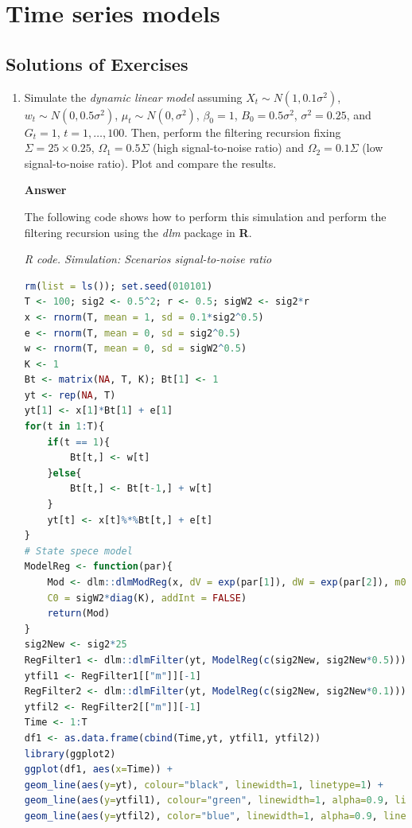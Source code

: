 \chapter{Time series models}\label{chap8}

\section{Solutions of Exercises}\label{sec81}
\begin{enumerate}[leftmargin=*]
	
	\item Simulate the \textit{dynamic linear model} assuming $X_t\sim N(1, 0.1\sigma^2)$, $w_t\sim N(0, 0.5\sigma^2)$, $\mu_t\sim N(0, \sigma^2)$, $\beta_0=1$, ${B}_0=0.5\sigma^2$, $\sigma^2=0.25$, and ${G}_t=1$, $t=1,\dots,100$. Then, perform the filtering recursion fixing $\Sigma=25\times 0.25$, $\Omega_1=0.5\Sigma$ (high signal-to-noise ratio) and  $\Omega_2=0.1\Sigma$ (low signal-to-noise ratio). Plot and compare the results. 	
	
	\textbf{Answer}
	
	The following code shows how to perform this simulation and perform the filtering recursion using the \textit{dlm} package in \textbf{R}. 
	
	\begin{tcolorbox}[enhanced,width=4.67in,center upper,
		fontupper=\large\bfseries,drop shadow southwest,sharp corners]
		\textit{R code. Simulation: Scenarios signal-to-noise ratio}
		\begin{VF}
			\begin{lstlisting}[language=R]
rm(list = ls()); set.seed(010101)
T <- 100; sig2 <- 0.5^2; r <- 0.5; sigW2 <- sig2*r
x <- rnorm(T, mean = 1, sd = 0.1*sig2^0.5) 
e <- rnorm(T, mean = 0, sd = sig2^0.5)
w <- rnorm(T, mean = 0, sd = sigW2^0.5)
K <- 1 
Bt <- matrix(NA, T, K); Bt[1] <- 1
yt <- rep(NA, T) 
yt[1] <- x[1]*Bt[1] + e[1]
for(t in 1:T){
	if(t == 1){
		Bt[t,] <- w[t]
	}else{
		Bt[t,] <- Bt[t-1,] + w[t]
	}
	yt[t] <- x[t]%*%Bt[t,] + e[t]
}
# State spece model
ModelReg <- function(par){
	Mod <- dlm::dlmModReg(x, dV = exp(par[1]), dW = exp(par[2]), m0 = rep(1, K),
	C0 = sigW2*diag(K), addInt = FALSE)
	return(Mod)
}
sig2New <- sig2*25
RegFilter1 <- dlm::dlmFilter(yt, ModelReg(c(sig2New, sig2New*0.5)))
ytfil1 <- RegFilter1[["m"]][-1]
RegFilter2 <- dlm::dlmFilter(yt, ModelReg(c(sig2New, sig2New*0.1)))
ytfil2 <- RegFilter2[["m"]][-1]
Time <- 1:T
df1 <- as.data.frame(cbind(Time,yt, ytfil1, ytfil2))
library(ggplot2)
ggplot(df1, aes(x=Time)) +
geom_line(aes(y=yt), colour="black", linewidth=1, linetype=1) +
geom_line(aes(y=ytfil1), colour="green", linewidth=1, alpha=0.9, linetype=2) +
geom_line(aes(y=ytfil2), color="blue", linewidth=1, alpha=0.9, linetype=3)\end{lstlisting}
		\end{VF}
	\end{tcolorbox}


\end{enumerate}
